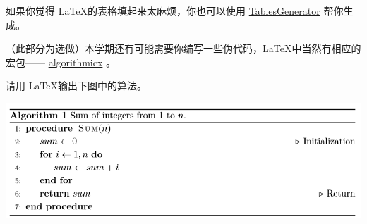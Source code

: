 \documentclass[12pt, a4paper, oneside]{ctexart}
\begin{document}
\begin{solution}

\end{solution}

\begin{note}
  如果你觉得 \LaTeX 的表格填起来太麻烦，你也可以使用 \href{https://www.tablesgenerator.com/}{TablesGenerator} 帮你生成。
\end{note}

\begin{problem}
（此部分为选做）本学期还有可能需要你编写一些伪代码，\LaTeX 中当然有相应的宏包—— \href{http://tug.ctan.org/macros/latex/contrib/algorithmicx/algorithmicx.pdf}{algorithmicx} 。

请用 \LaTeX 输出下图中的算法。

\includegraphics[width=\textwidth]{figs/algorithm}
\end{problem}

\begin{solution}

\end{solution}
\end{document}
